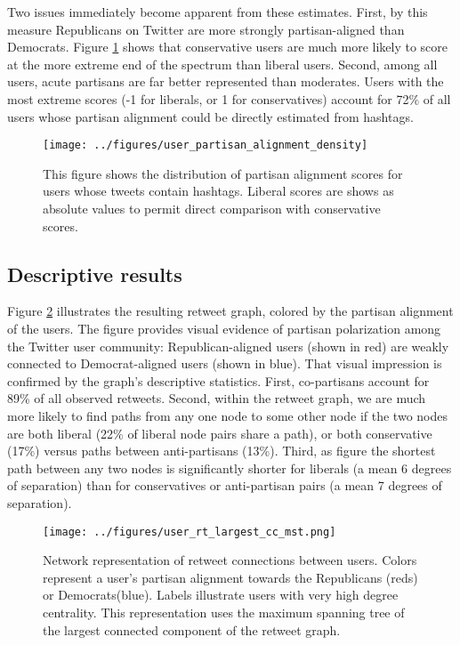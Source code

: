 \documentclass[11pt]{article}
\begin{document}
Two issues immediately become apparent from these estimates. First, by
this measure Republicans on Twitter are more strongly partisan-aligned
than Democrats. Figure \ref{fig:user-pscore-distribution} shows that
conservative users are much more likely to score at the more extreme
end of the spectrum than liberal users. Second, among all users, acute
partisans are far better represented than moderates. Users with the
most extreme scores (-1 for liberals, or 1 for conservatives) account
for 72\% of all users whose partisan alignment could be directly
estimated from hashtags. 

\begin{figure}[ht]
  \centering
  \texttt{[image: ../figures/user\_partisan\_alignment\_density]}
  \caption{This figure shows the distribution of partisan alignment
    scores for users whose tweets contain hashtags. Liberal scores are shows as absolute values to permit direct comparison with conservative scores. }
  \label{fig:user-pscore-distribution}
\end{figure}

\subsection{Descriptive results}
\label{sec:descriptive-results}

Figure \ref{fig:largest-cc-mst} illustrates the resulting retweet
graph, colored by the partisan alignment of the users. The figure
provides visual evidence of partisan polarization among the Twitter
user community: Republican-aligned users (shown in red) are weakly
connected to Democrat-aligned users (shown in blue). That visual
impression is confirmed by the graph's descriptive statistics. First,
co-partisans account for 89\% of all observed retweets. Second, within
the retweet graph, we are much more likely to find paths from any one
node to some other node if the two nodes are both liberal (22\% of
liberal node pairs share a path), or both conservative (17\%) versus
paths between anti-partisans (13\%). Third, as figure the shortest path between
any two nodes is significantly shorter for liberals (a mean 6 degrees
of separation) than for conservatives or anti-partisan pairs (a mean 7
degrees of separation). 

\begin{figure}[ht]
  \centering
  \texttt{[image: ../figures/user\_rt\_largest\_cc\_mst.png]}
  \caption{Network representation of retweet connections between
    users. Colors represent a user's partisan alignment towards the
    Republicans (reds) or Democrats(blue). Labels illustrate users with
    very high degree centrality. This representation uses the maximum
    spanning tree of the largest connected component of the retweet graph.}
  \label{fig:largest-cc-mst}
\end{figure}
\end{document}
